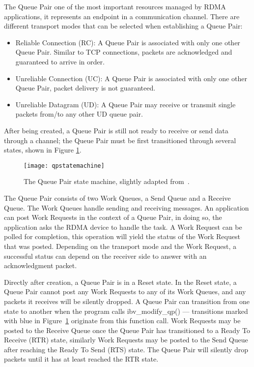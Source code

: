The Queue Pair one of the most important resources managed by RDMA applications, it represents an endpoint
in a communication channel. There are different transport modes that can be selected when establishing a Queue Pair\cite{rdmamanual}:

\begin{itemize}
  \item Reliable Connection (RC): A Queue Pair is associated with only one other Queue Pair. Similar to TCP connections, packets are acknowledged and guaranteed to arrive in order.
  \item Unreliable Connection (UC): A Queue Pair is associated with only one other Queue Pair, packet delivery is not guaranteed.
  \item Unreliable Datagram (UD): A Queue Pair may receive or transmit single packets from/to any other UD queue pair.
\end{itemize}

After being created, a Queue Pair is still not ready to receive or send data through a channel; the Queue Pair must be first
transitioned through several states, shown in Figure \ref{fig:qpstatemachine}.

\begin{figure}[h!]
  \centering
  \texttt{[image: qpstatemachine]}
  \caption[Queue Pair state machine]{The Queue Pair state machine, slightly adapted from~\cite{QPStateMachine2012}.}
  \label{fig:qpstatemachine}
\end{figure}

The Queue Pair consists of two Work Queues, a Send Queue and a Receive
Queue. The Work Queues handle sending and receiving messages.
An application can post Work Requests in the context of a Queue Pair, in
doing so, the application asks the RDMA device to handle the task.
A Work Request can be polled for completion, this operation will yield
the status of the Work Request that was posted. Depending on the transport
mode and the Work Request, a successful status can depend on the receiver
side to answer with an acknowledgment packet.

Directly after creation, a Queue Pair is in a Reset state. In the Reset state,
a Queue Pair cannot post any Work Requests to any
of its Work Queues, and any packets it receives will be silently dropped.
A Queue Pair can transition from one state to another when the program calls ibv\_modify\_qp() ---
transitions marked with blue in Figure~\ref{fig:qpstatemachine} originate from this function call.
Work Requests may be posted to the Receive Queue once the Queue Pair has transitioned to a Ready To Receive (RTR) state,
similarly Work Requests may be posted to the Send Queue after reaching the Ready To Send (RTS) state. The Queue Pair will silently drop
packets until it has at least reached the RTR state.

